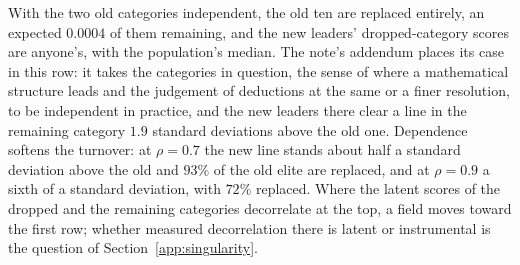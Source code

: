 \documentclass{article}
\begin{document}
With the two old categories independent, the old ten are replaced entirely, an expected $0.0004$ of them remaining, and the new leaders' dropped-category scores are anyone's, with the population's median. The note's addendum places its case in this row: it takes the categories in question, the sense of where a mathematical structure leads and the judgement of deductions at the same or a finer resolution, to be independent in practice, and the new leaders there clear a line in the remaining category $1.9$ standard deviations above the old one. Dependence softens the turnover: at $\rho = 0.7$ the new line stands about half a standard deviation above the old and $93\%$ of the old elite are replaced, and at $\rho = 0.9$ a sixth of a standard deviation, with $72\%$ replaced. Where the latent scores of the dropped and the remaining categories decorrelate at the top, a field moves toward the first row; whether measured decorrelation there is latent or instrumental is the question of Section~\ref{app:singularity}.
\end{document}
